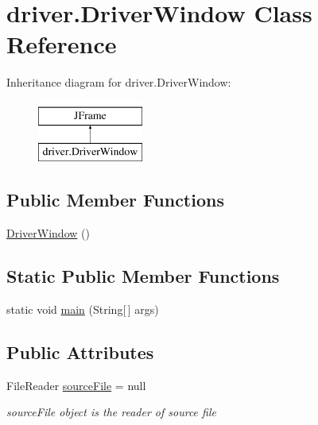 \hypertarget{classdriver_1_1DriverWindow}{}\section{driver.\+Driver\+Window Class Reference}
\label{classdriver_1_1DriverWindow}
Inheritance diagram for driver.\+Driver\+Window\+:\begin{figure}[H]
\begin{center}
\leavevmode
\includegraphics[height=2.000000cm]{classdriver_1_1DriverWindow}
\end{center}
\end{figure}
\subsection*{Public Member Functions}
\begin{DoxyCompactItemize}
\item 
\hyperlink{classdriver_1_1DriverWindow_acc35b31088a5ffe1543c28462b56194f}{Driver\+Window} ()
\end{DoxyCompactItemize}
\subsection*{Static Public Member Functions}
\begin{DoxyCompactItemize}
\item 
static void \hyperlink{classdriver_1_1DriverWindow_af743a70776a96562bbfb500b93a2e742}{main} (String\mbox{[}$\,$\mbox{]} args)
\end{DoxyCompactItemize}
\subsection*{Public Attributes}
\begin{DoxyCompactItemize}
\item 
File\+Reader \hyperlink{classdriver_1_1DriverWindow_a463a3d013ea4e8f95c818b2f7a7842d0}{source\+File} = null
\begin{DoxyCompactList}\small\item\em source\+File object is the reader of source file \end{DoxyCompactList}\end{DoxyCompactItemize}
